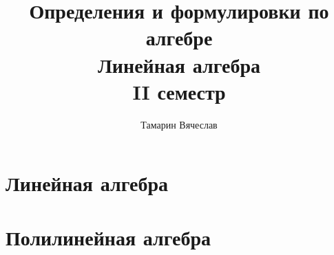 \documentclass[a4,11pt,dvipsnames]{report}
\title{Определения и формулировки по алгебре\\Линейная алгебра\\II семестр}
\author{Тамарин Вячеслав}
\begin{document}
\maketitle
\tableofcontents
\clearpage

\chapter{Линейная алгебра}
 
 
 
 
 
 
 
 
 
 
 
 
 
 
 
 
 
 
 
 
 
\clearpage
\chapter{Полилинейная алгебра}
\setcounter{section}{21}
 
 
 
 
 
 
 
 
 
 
 
 
 
 
\end{document}
